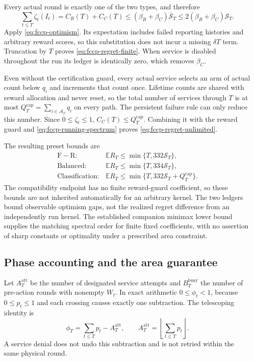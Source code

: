 \documentclass[11pt]{article}
\theoremstyle{remark}
\newcommand{\E}{\mathbb E}
\begin{document}
Every actual round is exactly one of the two types, and therefore
\[
 \sum_{t\le T}\zeta_t(I_t)=C_R(T)+C_C(T)
   \le(\beta_R+\beta_C)\overline{\mathcal S}_T
   \le2(\beta_R+\beta_C)\mathcal S_T.
\]
Apply \eqref{eq:fccp-optimism}. Its expectation includes failed
reporting histories and arbitrary reward scores, so this substitution
does not incur a missing $\delta T$ term. Truncation by $T$ proves
\eqref{eq:fccp-regret-finite}. When service is disabled throughout the run its ledger
is identically zero, which removes $\beta_C$.

Even without the certification guard, every actual service selects
an arm of actual count below $q_i$ and increments that count once.
Lifetime counts are shared with reward allocation and never reset,
so the total number of services through $T$ is at most
$Q_T^{\mathrm{cap}}=\sum_{i\in\mathcal A_T}q_i$ on every path.
The persistent failure rule can only reduce this number. Since
$0\le\zeta_t\le1$, $C_C(T)\le Q_T^{\mathrm{cap}}$.
Combining it with the reward guard and
\eqref{eq:fccp-running-spectrum} proves
\eqref{eq:fccp-regret-unlimited}.

The resulting preset bounds are
\[
 \begin{array}{ll}
 \mathrm{F\!\!\!-R}:&\E R_T\le\min\{T,332\mathcal S_T\},\\
 \mathrm{Balanced}:&\E R_T\le\min\{T,334\mathcal S_T\},\\
 \mathrm{Classification}:&\E R_T\le
                       \min\{T,332\mathcal S_T+Q_T^{\mathrm{cap}}\}.
 \end{array}
\]
The compatibility endpoint has no finite reward-guard coefficient, so
these bounds are not inherited automatically for an arbitrary kernel.
The two ledgers bound observable optimism gaps, not the realized regret
difference from an independently run kernel. The established companion
minimax lower bound supplies the matching spectral order for finite
fixed coefficients, with no assertion of sharp constants or optimality
under a prescribed area constraint.

\subsection{Phase accounting and the area guarantee}
Let $A_T^{\mathrm{att}}$ be the number of designated service attempts
and $B_T^{\mathrm{busy}}$ the number of pre-action rounds with nonempty
$W_t$. In exact arithmetic $0\le\phi_t<1$, because $0\le p_t\le1$
and each crossing causes exactly one subtraction. The telescoping
identity is
\begin{equation}\label{eq:fccp-phase}
 \phi_T=\sum_{t\le T}p_t-A_T^{\mathrm{att}},\qquad
 A_T^{\mathrm{att}}=\left\lfloor\sum_{t\le T}p_t\right\rfloor.
\end{equation}
A service denial does not undo this subtraction and is not retried
within the same physical round.
\end{document}
